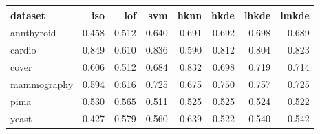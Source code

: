 \begin{tabular}{l|rrr|rrrr}
  \toprule
dataset & iso & lof & svm & hknn & hkde & lhkde & lmkde \\ 
  \midrule
annthyroid & 0.458 & 0.512 & 0.640 & 0.691 & 0.692 & $\bm{0.698}$ & 0.689 \\ 
  cardio & $\bm{0.849}$ & 0.610 & 0.836 & 0.590 & 0.812 & 0.804 & 0.823 \\ 
  cover & 0.606 & 0.512 & 0.684 & $\bm{0.832}$ & 0.698 & 0.719 & 0.714 \\ 
  mammography & 0.594 & 0.616 & 0.725 & 0.675 & $\bm{0.750}$ & 0.757 & 0.725 \\ 
  pima & 0.530 & $\bm{0.565}$ & 0.511 & 0.525 & 0.525 & 0.524 & 0.522 \\ 
  yeast & 0.427 & 0.579 & 0.560 & $\bm{0.639}$ & 0.522 & 0.540 & 0.542 \\ 
   \bottomrule
\end{tabular}
